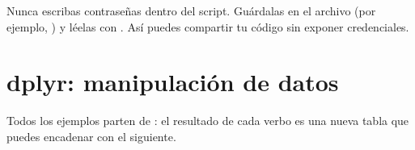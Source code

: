 \begin{advertencia}
Nunca escribas contraseñas dentro del script. Guárdalas en el archivo
 (por ejemplo, ) y léelas con
. Así puedes compartir tu código sin
exponer credenciales.
\end{advertencia}

\section{dplyr: manipulación de datos}
\label{sec:ap-b-dplyr}

Todos los ejemplos parten de : el resultado de
cada verbo es una nueva tabla que puedes encadenar con el siguiente.

